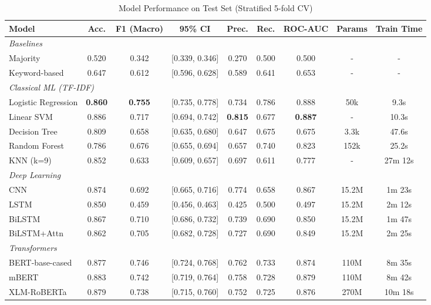 \documentclass[conference]{IEEEtran}
\begin{document}
\begin{table}[t]
\centering
\caption{Model Performance on Test Set (Stratified 5-fold CV)}
\label{tab:main_results}
\begin{tabular}{lcccccccc}
\toprule
\textbf{Model} & \textbf{Acc.} & \textbf{F1 (Macro)} & \textbf{95\% CI} & \textbf{Prec.} & \textbf{Rec.} & \textbf{ROC-AUC} & \textbf{Params} & \textbf{Train Time} \\
\midrule
\multicolumn{9}{l}{\textit{Baselines}} \\
Majority & 0.520 & 0.342 & [0.339, 0.346] & 0.270 & 0.500 & 0.500 & - & - \\
Keyword-based & 0.647 & 0.612 & [0.596, 0.628] & 0.589 & 0.641 & 0.653 & - & - \\
\midrule
\multicolumn{9}{l}{\textit{Classical ML (TF-IDF)}} \\
Logistic Regression & \textbf{0.860} & \textbf{0.755} & [0.735, 0.778] & 0.734 & 0.786 & 0.888 & 50k & 9.3s \\
Linear SVM & 0.886 & 0.717 & [0.694, 0.742] & \textbf{0.815} & 0.677 & \textbf{0.887} & - & 10.3s \\
Decision Tree & 0.809 & 0.658 & [0.635, 0.680] & 0.647 & 0.675 & 0.675 & 3.3k & 47.6s \\
Random Forest & 0.786 & 0.676 & [0.655, 0.694] & 0.657 & 0.740 & 0.823 & 152k & 25.2s \\
KNN (k=9) & 0.852 & 0.633 & [0.609, 0.657] & 0.697 & 0.611 & 0.777 & - & 27m 12s \\
\midrule
\multicolumn{9}{l}{\textit{Deep Learning}} \\
CNN & 0.874 & 0.692 & [0.665, 0.716] & 0.774 & 0.658 & 0.867 & 15.2M & 1m 23s \\
LSTM & 0.850 & 0.459 & [0.456, 0.463] & 0.425 & 0.500 & 0.497 & 15.2M & 2m 12s \\
BiLSTM & 0.867 & 0.710 & [0.686, 0.732] & 0.739 & 0.690 & 0.850 & 15.2M & 1m 47s \\
BiLSTM+Attn & 0.862 & 0.705 & [0.682, 0.728] & 0.727 & 0.690 & 0.849 & 15.2M & 2m 25s \\
\midrule
\multicolumn{9}{l}{\textit{Transformers}} \\
BERT-base-cased & 0.877 & 0.746 & [0.724, 0.768] & 0.762 & 0.733 & 0.874 & 110M & 8m 35s \\
mBERT & 0.883 & 0.742 & [0.719, 0.764] & 0.758 & 0.728 & 0.879 & 110M & 8m 42s \\
XLM-RoBERTa & 0.879 & 0.738 & [0.715, 0.760] & 0.752 & 0.725 & 0.876 & 270M & 10m 18s \\
\bottomrule
\end{tabular}
\end{table}
\end{document}
